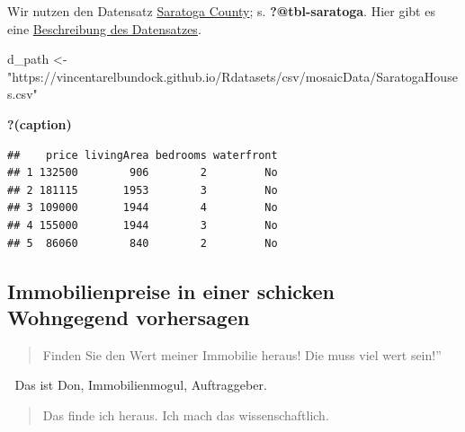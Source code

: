 \documentclass[
  a4paper,
  DIV=11]{scrreprt}
\newenvironment{Shaded}{\begin{snugshade}}{\end{snugshade}}
\newcommand{\NormalTok}[1]{\textcolor[rgb]{0.00,0.23,0.31}{#1}}
\newcommand{\OtherTok}[1]{\textcolor[rgb]{0.00,0.23,0.31}{#1}}
\newcommand{\StringTok}[1]{\textcolor[rgb]{0.13,0.47,0.30}{#1}}
\theoremstyle{definition}
\theoremstyle{remark}
\begin{document}
Wir nutzen den Datensatz
\href{https://vincentarelbundock.github.io/Rdatasets/csv/mosaicData/SaratogaHouses.csv}{Saratoga
County}; s. \textbf{?@tbl-saratoga}. Hier gibt es eine
\href{https://vincentarelbundock.github.io/Rdatasets/doc/mosaicData/SaratogaHouses.html}{Beschreibung
des Datensatzes}.

\begin{Shaded}
\begin{Highlighting}[]
\NormalTok{d\_path }\OtherTok{\textless{}{-}} \StringTok{"https://vincentarelbundock.github.io/Rdatasets/csv/mosaicData/SaratogaHouses.csv"}
\end{Highlighting}
\end{Shaded}

\begin{table}

\caption{\textbf{?(caption)}}\begin{minipage}[t]{\linewidth}

{\centering 

\begin{verbatim}
##    price livingArea bedrooms waterfront
## 1 132500        906        2         No
## 2 181115       1953        3         No
## 3 109000       1944        4         No
## 4 155000       1944        3         No
## 5  86060        840        2         No
\end{verbatim}

}

\end{minipage}%

\end{table}

\hypertarget{immobilienpreise-in-einer-schicken-wohngegend-vorhersagen}{%
\subsection{Immobilienpreise in einer schicken Wohngegend
vorhersagen}\label{immobilienpreise-in-einer-schicken-wohngegend-vorhersagen}}

\begin{quote}
Finden Sie den Wert meiner Immobilie heraus! Die muss viel wert sein!''
\end{quote}

🧑 Das ist Don, Immobilienmogul, Auftraggeber.

\begin{quote}
Das finde ich heraus. Ich mach das wissenschaftlich.
\end{quote}
\end{document}
